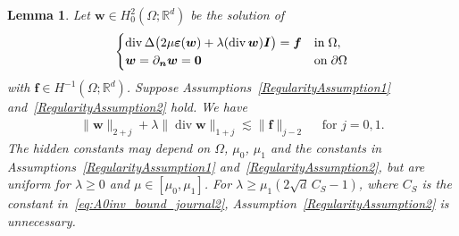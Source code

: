 \documentclass[10pt]{amsart}
\newtheorem{lemma}[theorem]{Lemma}
\renewcommand{\div}{\operatorname{div}}
\numberwithin{equation}{section}
\begin{document}
\begin{lemma}\label{lm:fourthorderelasregularity}
	Let $\boldsymbol w\in H_0^2(\Omega; \mathbb R^d)$ be the solution of
	\begin{equation}\label{eq:fourthorderelasproblem}
	\begin{cases}
	\div\Delta\big(2\mu\boldsymbol\varepsilon(\boldsymbol w)+\lambda(\div\boldsymbol w)\boldsymbol I\big)=\boldsymbol f & {\rm  in }\; \Omega,\\
	\boldsymbol w=\partial_{\boldsymbol{n}}\boldsymbol w=\boldsymbol 0 & {\rm on }\; \partial\Omega
	\end{cases}
	\end{equation}
with $\boldsymbol f\in H^{-1}(\Omega; \mathbb{R}^d)$.
	Suppose Assumptions~\ref{RegularityAssumption1} and~\ref{RegularityAssumption2} hold.
	We have
	\begin{align}\label{eq:fourthorderelasregularity}
	\|\boldsymbol w\|_{2+j}+\lambda\|\div\boldsymbol w\|_{1+j}\lesssim \|\boldsymbol f\|_{j-2} \quad\textrm{ for } j=0,1.
	\end{align}
The hidden constants may depend on $\Omega$, $\mu_0$, $\mu_1$ and the constants
in Assumptions~\ref{RegularityAssumption1} and~\ref{RegularityAssumption2},
but are uniform for $\lambda\geq0$ and $\mu\in[\mu_0,\mu_1]$. For $\lambda\geq\mu_1(2\sqrt d\,C_S-1)$, where $C_S$ is the constant in~\eqref{eq:A0inv_bound_journal2}, Assumption~\ref{RegularityAssumption2} is unnecessary.
\end{lemma}
\end{document}
